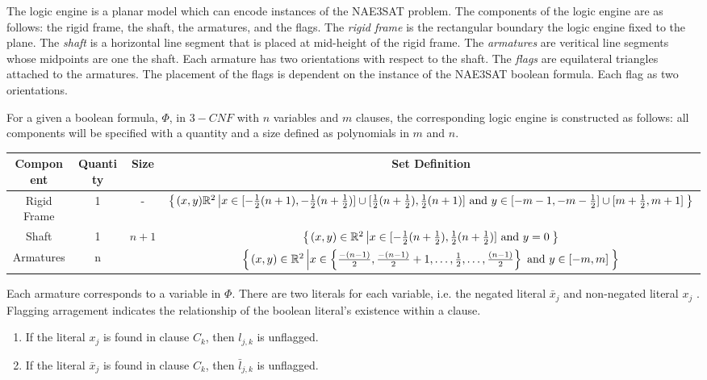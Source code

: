 The logic engine is a planar model which can encode instances of the NAE3SAT problem.  The 
components of the logic engine are as follows: the rigid frame, the shaft, the armatures,
 and the flags.  
The \textit{rigid frame} is the rectangular boundary the logic engine fixed to the plane.  The 
\textit{shaft} is a horizontal line segment that is placed at mid-height of the rigid frame.  The 
\textit{armatures} are veritical line segments whose midpoints are one the shaft.  Each armature 
has two orientations with respect to the shaft.  The \textit{flags} are equilateral triangles 
attached to the armatures.  The placement of the flags is dependent on the instance of the NAE3SAT 
boolean formula. Each flag as two orientations.

For a given a boolean formula, $\Phi$, in $3-CNF$ with $n$ variables and $m$ clauses, the 
corresponding logic engine is constructed as follows: all components will be specified with a 
quantity and a size defined as polynomials in $m$ and $n$.

\begin{tabular}{|c|c|c|c|}
\hline
Component & Quantity & Size & Set Definition\\\hline
Rigid Frame&1&-&${\left\lbrace \left. (x,y){\mathbb{R}}^2 \left\vert x \in [-\frac{1}{2}(n + 1),-\frac{1}{2}(n+\frac{1}{2})] \cup 
[\frac{1}{2}(n+\frac{1}{2}),\frac{1}{2}(n+1)] \text{ and }y \in [-m - 1,-m-\frac{1}{2}] \cup 
[m+\frac{1}{2},m+1] \right.\right.\right\rbrace }$\\\hline
Shaft&1&$n+1$&${\left\lbrace \left. (x,y) \in {\mathbb{R}}^2 \left\vert x \in 
[-\frac{1}{2}(n+\frac{1}{2}),\frac{1}{2}(n+\frac{1}{2})]\text{ and } y=0 \right.\right.\right\rbrace }$\\\hline
Armatures&n&&${\left\lbrace \left. (x,y)\in{\mathbb{R}}^2 \left\vert x \in \left\lbrace \frac{-(n-1)}{2},\frac{-(n-1)}{2} + 1 ,\dots, 
\frac{1}{2}, \dots,\frac{(n-1)}{2} \right\rbrace \text{ and } y \in [-m,m] \right.\right.\right\rbrace }$\\\hline
\end{tabular}
Each armature corresponds to a variable in $\Phi$. There are two literals for each variable, i.e. 
the negated literal $\bar{x}_j$ and non-negated literal $x_j$ .   Flagging arragement 
indicates the relationship of the boolean literal's existence within a clause. 
\begin{enumerate}
 \item If the literal $x_j$ is found in clause $C_k$, then $l_{j,k}$ is unflagged.
 \item If the literal $\bar{x}_j$ is found in clause $C_k$, then $\bar{l}_{j,k}$ is unflagged.
\end{enumerate}

